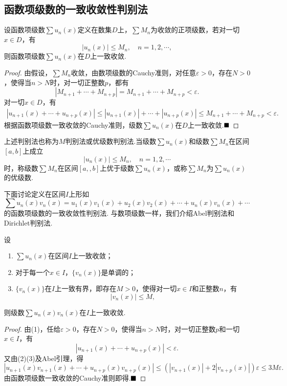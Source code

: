 \subsection{函数项级数的一致收敛性判别法}
\begin{theorem}[Weierstrass判别法]
	设函数项级数$\sum u_n(x)$定义在数集$D$上，$\sum M_n$为收敛的正项级数，若对一切$x\in D$，有
	$$|u_n(x)|\leqslant M_n,\quad n=1,2,\cdots,$$
	则函数项级数$\sum u_n(x)$在$D$上一致收敛.
\end{theorem}
\begin{proof}
	由假设，$\sum M_n$收敛，由数项级数的Cauchy准则，对任意$\varepsilon>0$，存在$N>0$，使得当$n>N$时，对一切正整数$p$，都有
	$$|M_{n+1}+\cdots+M_{n+p}|=M_{n+1}+\cdots+M_{n+p}<\varepsilon.$$
	对一切$x\in D$，有
	\begin{align*}
		|u_{n+1}(x)+\cdots+u_{n+p}(x)|\leqslant |u_{n+1}(x)|+\cdots+|u_{n+p}(x)|\leqslant M_{n+1}+\cdots+M_{n+p}<\varepsilon.
	\end{align*}
	根据函数项级数一致收敛的Cauchy准则，级数$\sum u_n(x)$在$D$上一致收敛.$\hfill\blacksquare$
\end{proof}
\begin{remark}
	上述判别法也称为$M${\heiti 判别法}或{\heiti 优级数判别法}.当级数$\sum u_n(x)$和级数$\sum M_n$在区间$\left[a,b\right]$上成立
	$$|u_n(x)|\leqslant M_n,\quad n=1,2,\cdots$$
	时，称级数$\sum M_n$在区间$\left[a,,b\right]$上优于级数$\sum u_n(x)$，或称$\sum M_n$为$\sum u_n(x)$的{\heiti 优级数}.
\end{remark}
下面讨论定义在区间$I$上形如
$$\sum u_n(x)v_n(x)=u_1(x)v_1(x)+u_2(x)v_2(x)+\cdots+u_n(x)v_n(x)+\cdots$$
的函数项级数的一致收敛性判别法. 与数项级数一样，我们介绍Abel判别法和Dirichlet判别法.
\begin{theorem}[Abel判别法]
	设
	\begin{enumerate}[(1)]
		\item $\sum u_n(x)$在区间$I$上一致收敛；
		\item 对于每一个$x\in I$，$\{v_n(x)\}$是单调的；
		\item $\{v_n(x)\}$在$I$上一致有界，即存在$M>0$，使得对一切$x\in I$和正整数$n$，有
		$$|v_n(x)|\leqslant M,$$
	\end{enumerate}
	则级数$\sum u_n(x)v_n(x)$在$I$上一致收敛.
\end{theorem}
\begin{proof}
	由(1)，任给$\varepsilon>0$，存在$N>0$，使得当$n>N$时，对一切正整数$p$和一切$x\in I$，有
	$$|u_{n+1}(x)+\cdots+u_{n+p}(x)|<\varepsilon.$$
	又由(2)(3)及Abel引理，得
	$$|u_{n+1}(x)v_{n+1}(x)+\cdots+u_{n+p}(x)v_{n+p}(x)|\leqslant (|v_{n+1}(x)|+2|v_{n+p}(x)|)\varepsilon\leqslant 3M\varepsilon.$$
	由函数项级数一致收敛的Cauchy准则即得.$\hfill\blacksquare$
\end{proof}
